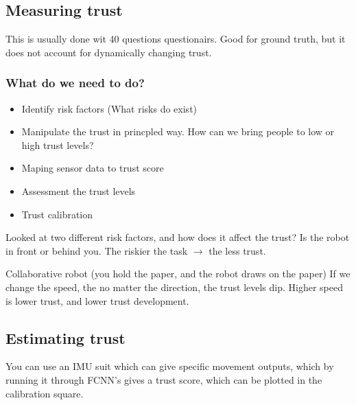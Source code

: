 \documentclass[a4paper]{article}
\begin{document}
\subsection{Measuring trust}
This is usually done wit 40 questions questionairs. Good for ground truth, but it does not account for dynamically changing trust. 

\subsubsection{What do we need to do?}
\begin{itemize}
	\item Identify risk factors (What risks do exist)
	\item Manipulate the trust in princpled way. How can we bring people to low or high trust levels?
	\item Maping sensor data to trust score
	\item Assessment the trust levels
	\item Trust calibration
\end{itemize}

Looked at two different risk factors, and how does it affect the trust?
Is the robot in front or behind you. The riskier the task $ \rightarrow $ the less trust. 

Collaborative robot (you hold the paper, and the robot draws on the paper)
If we change the speed, the no matter the direction, the trust levels dip. Higher speed is lower trust, and lower trust development.

\subsection{Estimating trust }
You can use an IMU suit which can give specific movement outputs, which by running it through FCNN's gives a trust score, which can be plotted in the calibration square. 
\end{document}
